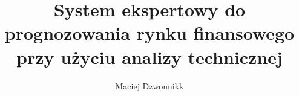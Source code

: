 \documentclass[a4paper,12pt,twoside]{book}
\author{Maciej Dzwonnikk}
\title{System ekspertowy do prognozowania rynku finansowego przy użyciu analizy technicznej}
\begin{document}
\frontmatter

\tableofcontents

\mainmatter
\pagestyle{headings}


%







\appendix
\renewcommand{\chaptermark}[1]{%
\markboth{\MakeUppercase{%
DODATEK \thechapter.%
\ }}{}}
%

\end{document}
